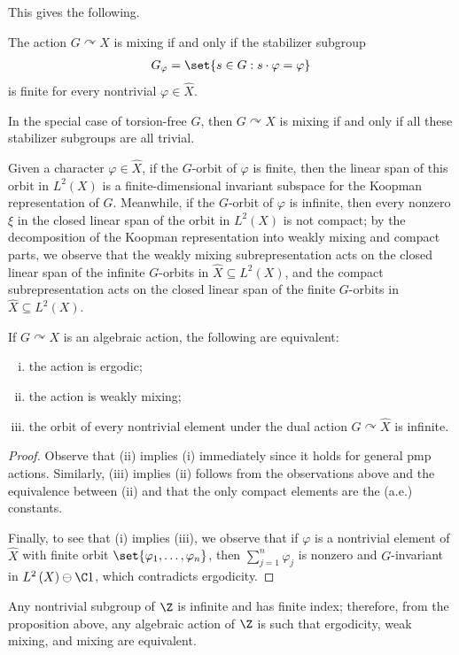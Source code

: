 \documentclass[10pt]{mypackage}
\begin{document}
This gives the following.
\begin{proposition}
  The action $G\curvearrowright X$ is mixing if and only if the stabilizer subgroup
  \begin{align*}
    G_{\varphi} = \set{s\in G : s\cdot\varphi = \varphi}
  \end{align*}
  is finite for every nontrivial $\varphi\in \widehat{X}$.

  In the special case of torsion-free $G$, then $G\curvearrowright X$ is mixing if and only if all these stabilizer subgroups are all trivial.
\end{proposition}
Given a character $\varphi\in \widehat{X}$, if the $G$-orbit of $\varphi$ is finite, then the linear span of this orbit in $L^2\left( X \right)$ is a finite-dimensional invariant subspace for the Koopman representation of $G$. Meanwhile, if the $G$-orbit of $\varphi$ is infinite, then every nonzero $\xi$ in the closed linear span of the orbit in $L^2\left( X \right)$ is not compact; by the decomposition of the Koopman representation into weakly mixing and compact parts, we observe that the weakly mixing subrepresentation acts on the closed linear span of the infinite $G$-orbits in $\widehat{X}\subseteq L^2\left( X \right)$, and the compact subrepresentation acts on the closed linear span of the finite $G$-orbits in $\widehat{X}\subseteq L^2\left( X \right)$.
\begin{proposition}
  If $G\curvearrowright X$ is an algebraic action, the following are equivalent:
  \begin{enumerate}[(i)]
    \item the action is ergodic;
    \item the action is weakly mixing;
    \item the orbit of every nontrivial element under the dual action $G\curvearrowright \widehat{X}$ is infinite.
  \end{enumerate}
\end{proposition}
\begin{proof}
  Observe that (ii) implies (i) immediately since it holds for general pmp actions. Similarly, (iii) implies (ii) follows from the observations above and the equivalence between (ii) and that the only compact elements are the (a.e.) constants.

  Finally, to see that (i) implies (iii), we observe that if $\varphi$ is a nontrivial element of $\widehat{X}$ with finite orbit $\set{\varphi_1,\dots,\varphi_n}$, then $\sum_{j=1}^{n}\varphi_j$ is nonzero and $G$-invariant in $L^2\left( X \right)\ominus \C 1$, which contradicts ergodicity.
\end{proof}
Any nontrivial subgroup of $\Z$ is infinite and has finite index; therefore, from the proposition above, any algebraic action of $\Z$ is such that ergodicity, weak mixing, and mixing are equivalent.
\end{document}
